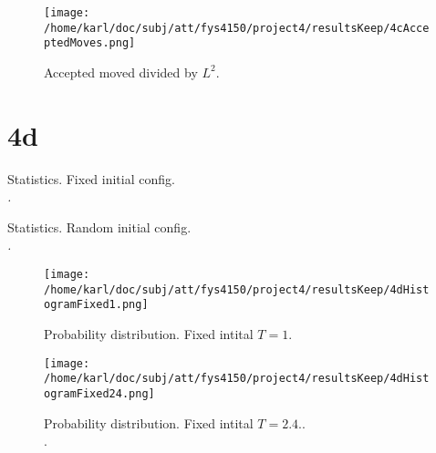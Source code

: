 \documentclass{article}
\begin{document}
\begin{figure}[H]
	\centering
	\texttt{[image: /home/karl/doc/subj/att/fys4150/project4/resultsKeep/4cAcceptedMoves.png]}
	\caption{Accepted moved divided by $L^2$. \\ \textit{}}
	\label{1}
\end{figure}

\section{4d}


\begin{table}[H]
	\centering
	\begin{adjustbox}{width=1\textwidth}
	\end{adjustbox}
	\caption{Statistics. Fixed initial config. \\ \textit{.}}
	\label{1}
\end{table}

\begin{table}[H]
	\centering
	\begin{adjustbox}{width=1\textwidth}
	\end{adjustbox}
	\caption{Statistics. Random initial config. \\ \textit{.}}
	\label{1}
\end{table}



\begin{minipage}{.45\textwidth} 
	\begin{figure}[H]
		\centering
		\texttt{[image: /home/karl/doc/subj/att/fys4150/project4/resultsKeep/4dHistogramFixed1.png]}
		\caption{Probability distribution. Fixed intital $T = 1$. \\ \textit{}}
		\label{1}
	\end{figure}
\end{minipage}\hfill
\begin{minipage}{.45\textwidth} 
	\begin{figure}[H]
		\centering
		\texttt{[image: /home/karl/doc/subj/att/fys4150/project4/resultsKeep/4dHistogramFixed24.png]}
		\caption{Probability distribution. Fixed intital $T = 2.4$.. \\ \textit{}.}
		\label{1}
	\end{figure}
\end{minipage}\hfill
\vspace{2ex}
\end{document}
